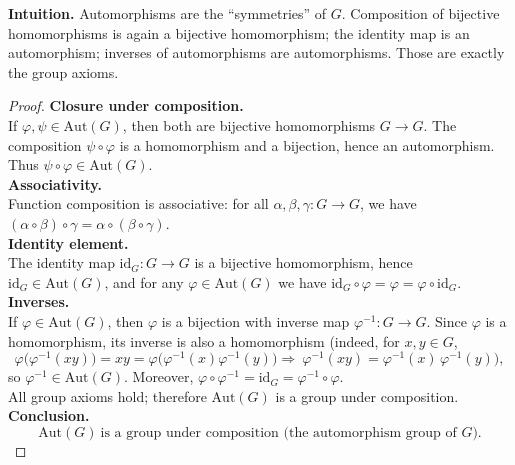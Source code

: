 \documentclass[12pt]{article}
\theoremstyle{definition}
\begin{document}
\dotfill

\noindent\textbf{Intuition.}
Automorphisms are the “symmetries” of $G$. Composition of bijective homomorphisms is again a bijective homomorphism; the identity map is an automorphism; inverses of automorphisms are automorphisms. Those are exactly the group axioms.\\

\dotfill

\begin{proof}
\noindent\textbf{Closure under composition.}\\
\noindent If $\varphi,\psi\in\mathrm{Aut}(G)$, then both are bijective homomorphisms $G\to G$. The composition $\psi\circ\varphi$ is a homomorphism and a bijection, hence an automorphism. Thus $\psi\circ\varphi\in\mathrm{Aut}(G)$.\\

\noindent\textbf{Associativity.}\\
\noindent Function composition is associative: for all $\alpha,\beta,\gamma:G\to G$, we have $(\alpha\circ\beta)\circ\gamma=\alpha\circ(\beta\circ\gamma)$.\\

\noindent\textbf{Identity element.}\\
\noindent The identity map $\mathrm{id}_G:G\to G$ is a bijective homomorphism, hence $\mathrm{id}_G\in\mathrm{Aut}(G)$, and for any $\varphi\in\mathrm{Aut}(G)$ we have $\mathrm{id}_G\circ\varphi=\varphi=\varphi\circ\mathrm{id}_G$.\\

\noindent\textbf{Inverses.}\\
\noindent If $\varphi\in\mathrm{Aut}(G)$, then $\varphi$ is a bijection with inverse map $\varphi^{-1}:G\to G$. Since $\varphi$ is a homomorphism, its inverse is also a homomorphism (indeed, for $x,y\in G$,
\[
\varphi\big(\varphi^{-1}(xy)\big)=xy=\varphi\big(\varphi^{-1}(x)\varphi^{-1}(y)\big)
\Rightarrow\ \varphi^{-1}(xy)=\varphi^{-1}(x)\,\varphi^{-1}(y)),
\]
so $\varphi^{-1}\in\mathrm{Aut}(G)$. Moreover, $\varphi\circ\varphi^{-1}=\mathrm{id}_G=\varphi^{-1}\circ\varphi$.\\

\noindent All group axioms hold; therefore $\mathrm{Aut}(G)$ is a group under composition.\\

\noindent\textbf{Conclusion.}
\[
\boxed{\,\mathrm{Aut}(G)\ \text{is a group under composition (the automorphism group of }G).\,}
\]
\end{proof}
\end{document}
